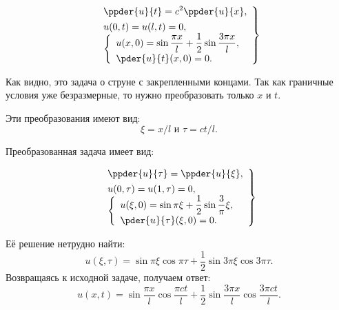 \begin{minipage}{.4\textwidth}
\[
    \left. \begin{array}{l}
        \ds \ppder{u}{t} = c^2\ppder{u}{x}, \\[.4em]
        u(0, t) = u(l, t) = 0, \\
        \left\{ \begin{array}{l}
            \ds u(x, 0) = \sin\frac{\pi x}{l} + \frac{1}{2}
            \sin\frac{3\pi x}{l}, \\[.4em]
            \ds \pder{u}{t}(x, 0) = 0.
        \end{array} \right.
    \end{array} \right\}
\]
\end{minipage}
\hfill
\begin{minipage}{.53\textwidth}
    Как видно, это задача о струне с закрепленными концами. Так как граничные
    условия уже безразмерные, то нужно преобразовать только \( x \) и \( t \).
    
    Эти преобразования имеют вид:
    \[
        \xi = x/l \text{ и } \tau = ct/l.
    \]
\end{minipage}

\vspace*{1em}
Преобразованная задача имеет вид:

\begin{minipage}{.4\textwidth}
\[
    \left. \begin{array}{l}
        \ds \ppder{u}{\tau} = \ppder{u}{\xi}, \\[.4em]
        u(0, \tau) = u(1, \tau) = 0, \\
        \left\{ \begin{array}{l}
            \ds u(\xi, 0) = \sin\pi\xi + \frac{1}{2}\sin\frac3\pi\xi, \\[.4em]
            \ds \pder{u}{\tau}(\xi, 0) = 0.
        \end{array} \right.
    \end{array} \right\}
\]
\end{minipage}
\hfill
\begin{minipage}{.55\textwidth}
    \vspace*{.7em}
    Её решение нетрудно найти:
    \[
        u(\xi, \tau) = \sin\pi\xi\cos\pi\tau +
        \frac{1}{2}\sin3\pi\xi\cos3\pi\tau.
    \]
    Возвращаясь к исходной задаче, получаем ответ:
    \[
        u(x, t) = \sin\frac{\pi x}{l}\cos\frac{\pi ct}{l} +
        \frac{1}{2}\sin\frac{3\pi x}{l}\cos\frac{3\pi ct}{l}.
    \]
\end{minipage}
\newpage
